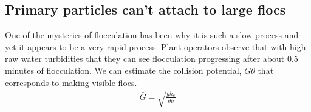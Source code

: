 \documentclass[letterpaper,10pt,english]{sphinxmanual}
\begin{document}
\subsection{Primary particles can’t attach to large flocs}
\label{\detokenize{Flocculation/Floc_Intro:primary-particles-cant-attach-to-large-flocs}}
One of the mysteries of flocculation has been why it is such a slow
process and yet it appears to be a very rapid process. Plant operators
observe that with high raw water turbidities that they can see
flocculation progressing after about 0.5 minutes of flocculation. We can
estimate the collision potential, \(G\theta\) that corresponds to
making visible flocs.
\begin{equation}\label{equation:Flocculation/Floc_Intro:Flocculation/Floc_Intro:0}
\begin{split}\bar G = \sqrt{ \frac{g h_e}{\theta \nu}}\end{split}
\end{equation}
%
\begin{sphinxVerbatim}[commandchars=\\\{\}]
  
    
   
  
  
  
  
\end{sphinxVerbatim}
\end{document}
